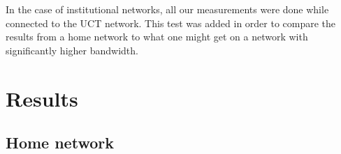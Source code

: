 \documentclass{sig-alternate-05-2015}
\begin{document}
In the case of institutional networks, all our measurements were done while connected to the UCT network. This test was added in order to compare the results from a home network to what one might get on a network with significantly higher bandwidth.

\section{Results}\label{sec:results}
\subsection{Home network}
\end{document}

